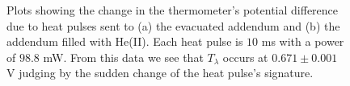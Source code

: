 \begin{figure}[htbp]
\begin{center}
\hspace{-1mm}
\vspace{-2mm}
\vspace{-2mm}
\caption{\small{Plots showing the change in the thermometer's potential difference due to heat pulses sent to (a) the evacuated addendum and (b) the addendum filled with He(II).  Each heat pulse is $10$ ms with a power of $98.8$ mW.  From this data we see that $T_{\lambda}$ occurs at $0.671 \pm 0.001$ V judging by the sudden change of the heat pulse's signature.}}
\label{fig:rawdata}
\end{center}
\end{figure}
